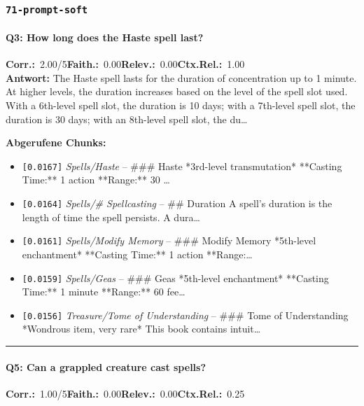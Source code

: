 \subsubsection*{\texttt{71-prompt-soft}}
\label{app:samples:71_prompt_soft}

\paragraph{Q3: How long does the Haste spell last?}
\noindent \textbf{Corr.:}~2.00/5\quad \textbf{Faith.:}~0.00\quad \textbf{Relev.:}~0.00\quad \textbf{Ctx.Rel.:}~1.00\\

\noindent\textbf{Antwort:} The Haste spell lasts for the duration of concentration up to 1 minute. At higher levels, the duration increases based on the level of the spell slot used. With a 6th-level spell slot, the duration is 10 days; with a 7th-level spell slot, the duration is 30 days; with an 8th-level spell slot, the du\ldots

\noindent\textbf{Abgerufene Chunks:}
\begin{itemize}[noitemsep, topsep=2pt]
  \item[\textbf{\#1}] \texttt{[0.0167]} \textit{Spells/Haste} -- \#\#\# Haste  *3rd-level transmutation*  **Casting Time:** 1 action  **Range:** 30 \ldots
  \item[\textbf{\#2}] \texttt{[0.0164]} \textit{Spells/# Spellcasting} -- \#\# Duration  A spell's duration is the length of time the spell persists. A dura\ldots
  \item[\textbf{\#3}] \texttt{[0.0161]} \textit{Spells/Modify Memory} -- \#\#\# Modify Memory  *5th-level enchantment*  **Casting Time:** 1 action  **Range:\ldots
  \item[\textbf{\#4}] \texttt{[0.0159]} \textit{Spells/Geas} -- \#\#\# Geas  *5th-level enchantment*  **Casting Time:** 1 minute  **Range:** 60 fee\ldots
  \item[\textbf{\#5}] \texttt{[0.0156]} \textit{Treasure/Tome of Understanding} -- \#\#\# Tome of Understanding  *Wondrous item, very rare*  This book contains intuit\ldots
\end{itemize}
\vspace{4pt}
\hrule
\vspace{6pt}

\paragraph{Q5: Can a grappled creature cast spells?}
\noindent \textbf{Corr.:}~1.00/5\quad \textbf{Faith.:}~0.00\quad \textbf{Relev.:}~0.00\quad \textbf{Ctx.Rel.:}~0.25\\

